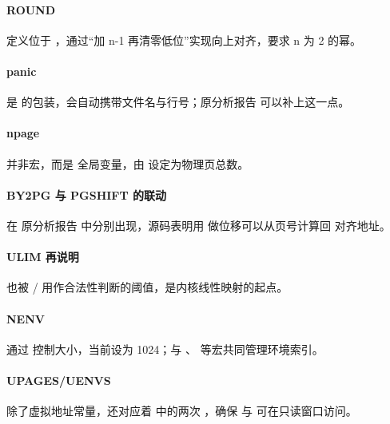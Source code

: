 \documentclass[12pt,oneside]{ctexbook}
\begin{document}
\paragraph{ROUND}
定义位于 ，通过“加 n-1 再清零低位”实现向上对齐，要求 n 为 2 的幂。

\paragraph{panic}
 是  的包装，会自动携带文件名与行号；原分析报告 可以补上这一点。

\paragraph{npage}
并非宏，而是  全局变量，由  设定为物理页总数。

\paragraph{BY2PG 与 PGSHIFT 的联动}
在 原分析报告 中分别出现，源码表明用  做位移可以从页号计算回  对齐地址。

\paragraph{ULIM 再说明}
 也被 / 用作合法性判断的阈值，是内核线性映射的起点。

\paragraph{NENV}
通过  控制大小，当前设为 1024；与 、 等宏共同管理环境索引。

\paragraph{UPAGES/UENVS}
除了虚拟地址常量，还对应着  中的两次 ，确保  与  可在只读窗口访问。
\end{document}

